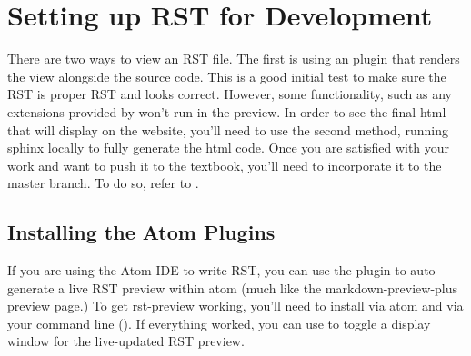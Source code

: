 \documentclass[letterpaper,10pt,english]{sphinxmanual}
\begin{document}
\section{Setting up RST for Development}
\label{\detokenize{Textbook_Creation_Help/rst_intro:setting-up-rst-for-development}}\label{\detokenize{Textbook_Creation_Help/rst_intro:heading-setting-up-rst}}
There are two ways to  view an RST file. The first is using an  plugin that renders the view alongside the source code. This is a good initial test to make sure the RST is proper RST and looks  correct. However, some functionality, such as any extensions provided by  won’t run in the preview. In order to see the final html that will display on the website, you’ll need to use the second method, running sphinx locally to fully generate the html code. Once you are satisfied with your work and want to push it to the textbook, you’ll need to incorporate it to the master branch. To do so, refer to {\hyperref[\detokenize{Textbook_Creation_Help/rst_intro:publishing-online}]{}}.


\subsection{Installing the Atom Plugins}
\label{\detokenize{Textbook_Creation_Help/rst_intro:installing-the-atom-plugins}}\label{\detokenize{Textbook_Creation_Help/rst_intro:heading-installing-atom}}
If you are using the Atom IDE to write RST, you can use the  plugin to auto-generate a live RST preview within atom (much like the markdown-preview-plus preview page.) To get rst-preview working, you’ll need to install  via atom and  via your command line (). If everything worked, you can use  to toggle a display window for the live-updated RST preview.
\end{document}
